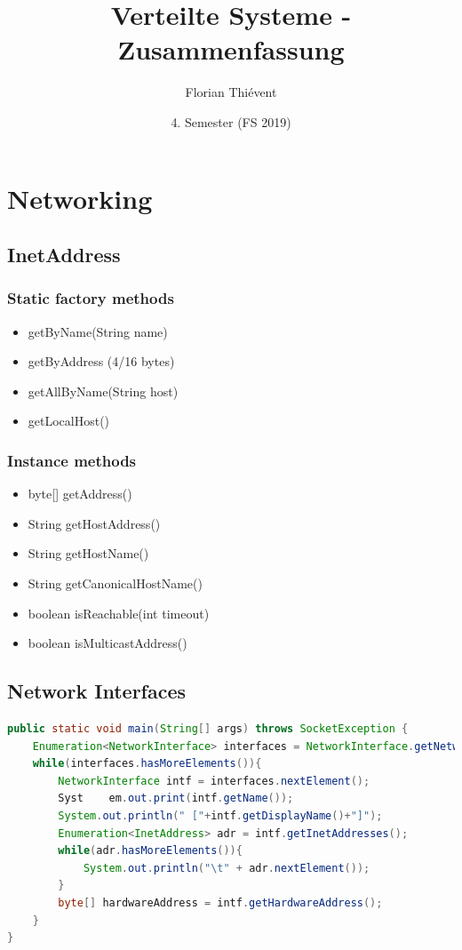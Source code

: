 \documentclass[10pt]{article}
\title{
	\vspace{5cm}
	Verteilte Systeme - Zusammenfassung
}
\author{Florian Thiévent}
\date{4. Semester (FS 2019)}
\begin{document}
\maketitle
\thispagestyle{fancy}

\newpage

\tableofcontents	  	


\newpage
\setcounter{page}{1}


\section{Networking}
\subsection{InetAddress}
\subsubsection*{Static factory methods}
\begin{itemize}
	\item getByName(String name)
	\item getByAddress (4/16 bytes)
	\item getAllByName(String host)
	\item getLocalHost()
\end{itemize}
\subsubsection*{Instance methods}
\begin{itemize}
	\item byte[] getAddress()
	\item String getHostAddress()
	\item String getHostName()
	\item String getCanonicalHostName()
	\item boolean isReachable(int timeout)
	\item boolean isMulticastAddress()
\end{itemize}
\subsection{Network Interfaces}
\begin{lstlisting}[language=Java, caption=Network Interfaces and its addresses, style=JavaStyle]
public static void main(String[] args) throws SocketException {
	Enumeration<NetworkInterface> interfaces = NetworkInterface.getNetworkInterfaces();
	while(interfaces.hasMoreElements()){
		NetworkInterface intf = interfaces.nextElement();
		Syst	em.out.print(intf.getName());
		System.out.println(" ["+intf.getDisplayName()+"]");
		Enumeration<InetAddress> adr = intf.getInetAddresses();
		while(adr.hasMoreElements()){
			System.out.println("\t" + adr.nextElement());
		}
		byte[] hardwareAddress = intf.getHardwareAddress();
	}
}
\end{lstlisting}
\end{document}
